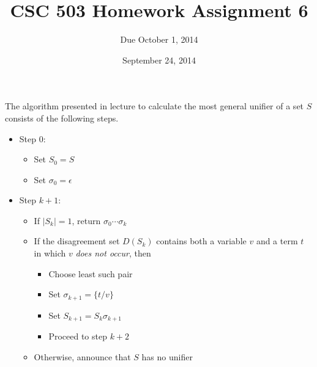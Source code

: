 \documentclass{article}
\title{CSC 503 Homework Assignment 6}
\author{Due October 1, 2014}
\date{September 24, 2014}
\begin{document}
\maketitle

\noindent
The algorithm presented in lecture to calculate the most general
unifier of a set $S$ consists of the following steps.
\begin{itemize}
\item Step 0:
  \begin{itemize}
  \item Set $S_0 = S$
  \item Set $\sigma_0 = \epsilon$
  \end{itemize}

\item Step $k+1$:
    \begin{itemize}
    \item If $|S_k| = 1$, return $\sigma_0\cdots\sigma_k$
    \item If the disagreement set $D(S_k)$ contains both a variable
      $v$ and a term $t$ in which $v$ \emph{does not occur}, then
      \begin{itemize}
      \item Choose least such pair
      \item Set $\sigma_{k+1} = \{ t/v \}$
      \item Set $S_{k+1} = S_k \sigma_{k+1}$
      \item Proceed to step $k+2$
      \end{itemize}
    \item Otherwise, announce that $S$ has no unifier
    \end{itemize}
  \end{itemize}
\end{document}
